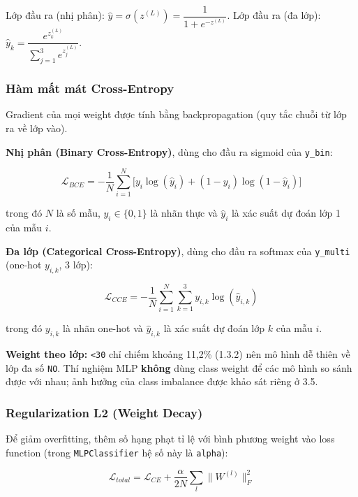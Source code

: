 \documentclass[a4paper]{report}
\begin{document}
Lớp đầu ra (nhị phân): $\hat{y} = \sigma(z^{(L)}) = \dfrac{1}{1 + e^{-z^{(L)}}}$. Lớp đầu ra (đa lớp): $\hat{y}_k = \dfrac{e^{z^{(L)}_k}}{\sum_{j=1}^{3} e^{z^{(L)}_j}}$.

\subsubsection{Hàm mất mát Cross-Entropy}

Gradient của mọi weight được tính bằng backpropagation (quy tắc chuỗi từ lớp ra về lớp vào).

\textbf{Nhị phân (Binary Cross-Entropy)}, dùng cho đầu ra sigmoid của \texttt{y\_\allowbreak{}bin}:

\begin{equation}
  \mathcal{L}_{BCE} = -\frac{1}{N}\sum_{i=1}^{N}\Big[y_i \log(\hat{y}_i) + (1-y_i)\log(1-\hat{y}_i)\Big]
\end{equation}

trong đó $N$ là số mẫu, $y_i \in \{0,1\}$ là nhãn thực và $\hat{y}_i$ là xác suất dự đoán lớp 1 của mẫu $i$.

\textbf{Đa lớp (Categorical Cross-Entropy)}, dùng cho đầu ra softmax của \texttt{y\_\allowbreak{}multi} (one-hot $y_{i,k}$, 3 lớp):

\begin{equation}
  \mathcal{L}_{CCE} = -\frac{1}{N}\sum_{i=1}^{N}\sum_{k=1}^{3} y_{i,k}\log(\hat{y}_{i,k})
\end{equation}

trong đó $y_{i,k}$ là nhãn one-hot và $\hat{y}_{i,k}$ là xác suất dự đoán lớp $k$ của mẫu $i$.

\textbf{Weight theo lớp:} \texttt{<30} chỉ chiếm khoảng 11,2\% (1.3.2) nên mô hình dễ thiên về lớp đa số \texttt{NO}. Thí nghiệm MLP \textbf{không} dùng class weight để các mô hình so sánh được với nhau; ảnh hưởng của class imbalance được khảo sát riêng ở 3.5.

\subsubsection{Regularization L2 (Weight Decay)}

Để giảm overfitting, thêm số hạng phạt tỉ lệ với bình phương weight vào loss function (trong \texttt{MLPClassifier} hệ số này là \texttt{alpha}):

\begin{equation}
  \mathcal{L}_{total} = \mathcal{L}_{CE} + \frac{\alpha}{2N} \sum_{l} \|W^{(l)}\|_F^2
\end{equation}
\end{document}
